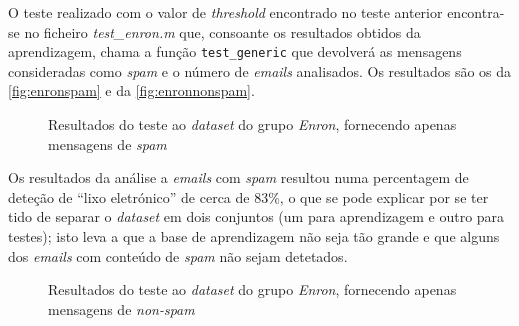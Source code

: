 \documentclass[a4paper,11pt,openright,oneside]{report}
\begin{document}
O teste realizado com o valor de \textit{threshold} encontrado no teste anterior encontra-se no ficheiro \textit{test\_enron.m} que, consoante os resultados obtidos da aprendizagem, chama a função \texttt{test\_generic} que devolverá as mensagens consideradas como \textit{spam} e o número de \textit{emails} analisados. Os resultados são os da \autoref{fig:enronspam} e da \autoref{fig:enronnonspam}.

\begin{figure}[ht]
\center
{}
\caption{Resultados do teste ao \textit{dataset} do grupo \textit{Enron}, fornecendo apenas mensagens de \textit{spam}}
\label{fig:enronspam}
\end{figure}

Os resultados da análise a \textit{emails} com \textit{spam} resultou numa percentagem de deteção de ``lixo eletrónico'' de cerca de 83\%, o que se pode explicar por se ter tido de separar o \textit{dataset} em dois conjuntos (um para aprendizagem e outro para testes); isto leva a que a base de aprendizagem não seja tão grande e que alguns dos \textit{emails} com conteúdo de \textit{spam} não sejam detetados.

\begin{figure}[ht]
\center
{}
\caption{Resultados do teste ao \textit{dataset} do grupo \textit{Enron}, fornecendo apenas mensagens de \textit{non-spam}}
\label{fig:enronnonspam}
\end{figure}
\end{document}
